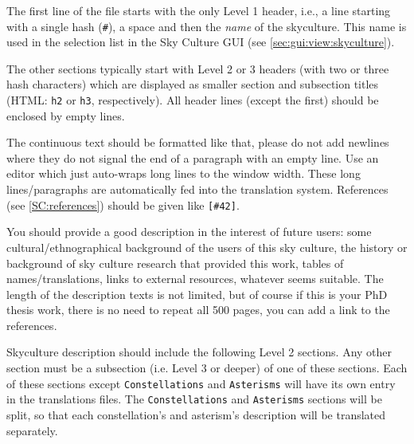 The first line of the file starts with the only Level 1 header, 
i.e., a line starting with a single hash (\texttt{\#}), 
a space and then the \emph{name} of the skyculture. 
This name is used in the selection list in the Sky Culture GUI (see \ref{sec:gui:view:skyculture}). 
 
The other sections typically start with Level 2 or 3 headers (with two or three hash characters) which are displayed as smaller section and 
subsection titles (HTML: \texttt{h2} or \texttt{h3}, respectively).  All header lines (except the first) should be enclosed by empty lines. 

The continuous text should be formatted like that, please do not add newlines where they do not signal the end of a paragraph with an empty line. 
Use an editor which just auto-wraps long lines to the window width. 
These long lines/paragraphs are automatically fed into the translation system. References (see \ref{SC:references}) should be given like \texttt{[\#42]}.
 
You should provide a good description in the interest of future users:
some cultural/ethnographical background of the users of this sky culture,
the history or background of sky culture research that provided this work, tables of names/translations,
links to external resources, whatever seems suitable.  The length of the description texts is not limited, 
but of course if this is your PhD thesis work, there is no need to repeat all 500 pages, you can add a link to the references.

Skyculture description should include the following Level 2 sections. Any other section must be a subsection (i.e. Level 3 or deeper) of one of these sections. 
Each of these sections except \texttt{Constellations} and \texttt{Asterisms} will have its own entry in the translations files. 
The \texttt{Constellations} and \texttt{Asterisms} sections will be split, so that each constellation's and asterism's description will be translated separately.

